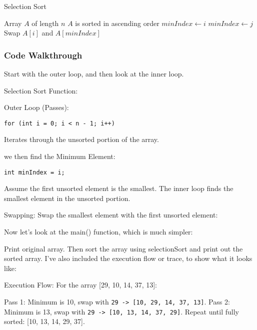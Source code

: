 \documentclass[a4paper,12pt]{article}
\begin{document}
\begin{algorithm}
\caption{Selection Sort}
\begin{algorithmic}[1]
\Require Array $A$ of length $n$
\Ensure $A$ is sorted in ascending order
    \State $minIndex \gets i$
            \State $minIndex \gets j$
        \EndIf
    \EndFor
        \State Swap $A[i]$ and $A[minIndex]$
    \EndIf
\EndFor
\end{algorithmic}
\end{algorithm}

\subsubsection{Code Walkthrough}

Start with the outer loop, and then look at the inner loop.

Selection Sort Function:

Outer Loop (Passes):

\verb|for (int i = 0; i < n - 1; i++)|

Iterates through the unsorted portion of the array.

we then find the Minimum Element:

\verb|int minIndex = i;|

Assume the first unsorted element is the smallest. The inner loop finds the smallest element in the unsorted portion.

Swapping: Swap the smallest element with the first unsorted element:

Now let's look at the main() function, which is much simpler:

Print original array. Then sort the array using selectionSort and print out the sorted array. I've also included the execution flow or trace, to show what it looks like:

Execution Flow:
For the array [29, 10, 14, 37, 13]:

Pass 1:
Minimum is 10, swap with \verb|29 -> [10, 29, 14, 37, 13]|.
Pass 2:
Minimum is 13, swap with \verb|29 -> [10, 13, 14, 37, 29]|.
Repeat until fully sorted: [10, 13, 14, 29, 37].
\end{document}
